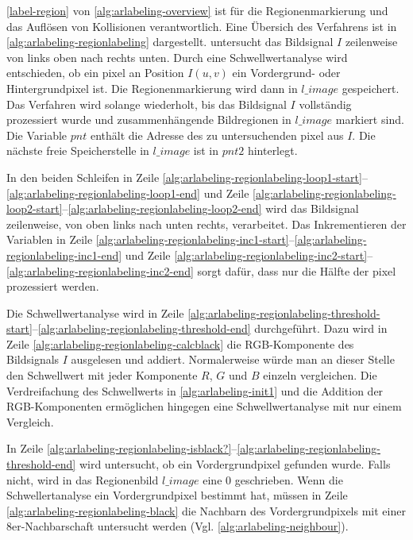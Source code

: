 \autoref{label-region} von \autoref{alg:arlabeling-overview} ist für die Regionenmarkierung und das Auflösen von
 Kollisionen verantwortlich. Eine Übersich des Verfahrens ist in \autoref{alg:arlabeling-regionlabeling} dargestellt.
  untersucht das Bildsignal $I$ zeilenweise von links oben nach rechts unten. Durch eine
 Schwellwertanalyse wird entschieden, ob ein \gls{pixel} an Position $I(u,v)$ ein Vordergrund- oder Hintergrundpixel
 ist. Die Regionenmarkierung wird dann in $\mathit{l\_image}$ gespeichert. Das Verfahren wird solange wiederholt, bis
 das Bildsignal $I$ vollständig prozessiert wurde und zusammenhängende Bildregionen in $\mathit{l\_image}$ markiert
 sind. Die Variable $\mathit{pnt}$ enthält die Adresse des zu untersuchenden \gls{pixel} aus $I$. Die nächste freie
 Speicherstelle in $\mathit{l\_image}$ ist in $\mathit{pnt2}$ hinterlegt.



In den beiden Schleifen in Zeile
 \ref{alg:arlabeling-regionlabeling-loop1-start}--\ref{alg:arlabeling-regionlabeling-loop1-end} und Zeile
 \ref{alg:arlabeling-regionlabeling-loop2-start}--\ref{alg:arlabeling-regionlabeling-loop2-end} wird das Bildsignal
 zeilenweise, von oben links nach unten rechts, verarbeitet. Das Inkrementieren der Variablen in Zeile
 \ref{alg:arlabeling-regionlabeling-inc1-start}--\ref{alg:arlabeling-regionlabeling-inc1-end} und Zeile
 \ref{alg:arlabeling-regionlabeling-inc2-start}--\ref{alg:arlabeling-regionlabeling-inc2-end} sorgt dafür, dass nur die
 Hälfte der \gls{pixel} prozessiert werden.

Die Schwellwertanalyse wird in Zeile
 \ref{alg:arlabeling-regionlabeling-threshold-start}--\ref{alg:arlabeling-regionlabeling-threshold-end} durchgeführt.
 Dazu wird in Zeile \ref{alg:arlabeling-regionlabeling-calcblack} die RGB-Komponente des Bildsignals $I$ ausgelesen und
 addiert. Normalerweise würde man an dieser Stelle den Schwellwert mit jeder Komponente $R$, $G$ und $B$ einzeln
 vergleichen. Die Verdreifachung des Schwellwerts in \autoref{alg:arlabeling-init1} und die Addition der
 RGB-Komponenten ermöglichen hingegen eine Schwellwertanalyse mit nur einem Vergleich.\label{sub:arlabel-threshold}

In Zeile \ref{alg:arlabeling-regionlabeling-isblack?}--\ref{alg:arlabeling-regionlabeling-threshold-end} wird
 untersucht, ob ein Vordergrundpixel gefunden wurde. Falls nicht, wird in das Regionenbild $\mathit{l\_image}$ eine $0$
 geschrieben. Wenn die Schwellertanalyse ein Vordergrundpixel bestimmt hat, müssen in Zeile
 \ref{alg:arlabeling-regionlabeling-black} die Nachbarn des Vordergrundpixels mit einer 8er-Nachbarschaft untersucht
 werden (Vgl. \autoref{alg:arlabeling-neighbour}).

